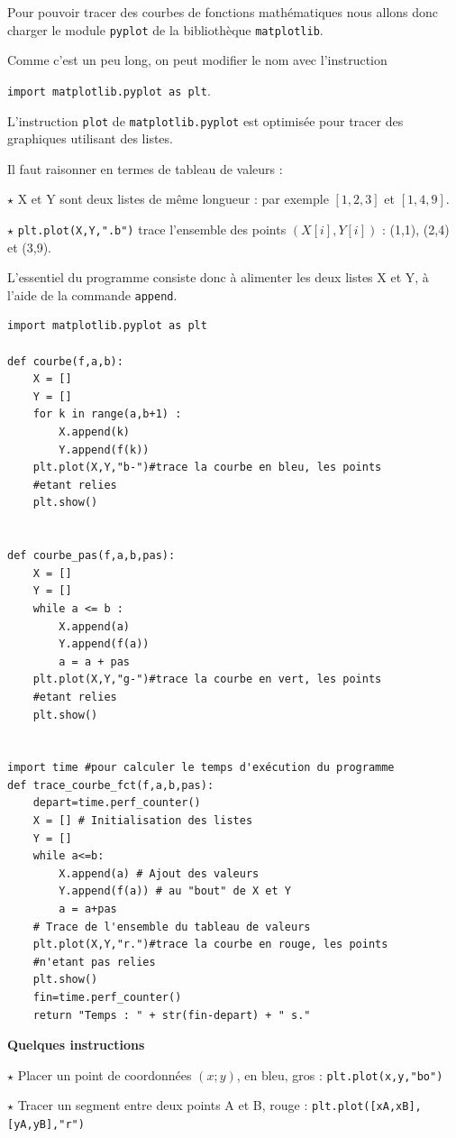 Pour pouvoir tracer des courbes de fonctions mathématiques nous allons donc charger le module \verb!pyplot! de la bibliothèque \verb!matplotlib!.

Comme c'est un peu long, on peut modifier le nom avec l'instruction 

\verb!import matplotlib.pyplot as plt!.


L'instruction \verb!plot! de \verb!matplotlib.pyplot! est optimisée pour tracer des graphiques utilisant des listes. 

Il faut raisonner en termes de \og tableau de valeurs \fg{} :

$\star$ X et Y sont deux listes de même longueur : par exemple $[1,2,3]$ et $[1,4,9]$.

$\star$ \verb!plt.plot(X,Y,".b")! trace l'ensemble des points $(X[i] ,Y[i])$ : (1,1), (2,4) et (3,9).

L'essentiel du programme consiste donc à alimenter les deux listes X et Y, à l'aide de la commande \verb!append!.

\begin{lstlisting}
import matplotlib.pyplot as plt

def courbe(f,a,b):
    X = []
    Y = []
    for k in range(a,b+1) :
        X.append(k)
        Y.append(f(k))
    plt.plot(X,Y,"b-")#trace la courbe en bleu, les points 
    #etant relies
    plt.show()


def courbe_pas(f,a,b,pas):
    X = []
    Y = []
    while a <= b :
        X.append(a)
        Y.append(f(a))
        a = a + pas
    plt.plot(X,Y,"g-")#trace la courbe en vert, les points 
    #etant relies
    plt.show()


import time #pour calculer le temps d'exécution du programme
def trace_courbe_fct(f,a,b,pas):
    depart=time.perf_counter()
    X = [] # Initialisation des listes
    Y = []
    while a<=b:
        X.append(a) # Ajout des valeurs
        Y.append(f(a)) # au "bout" de X et Y
        a = a+pas
    # Trace de l'ensemble du tableau de valeurs
    plt.plot(X,Y,"r.")#trace la courbe en rouge, les points 
    #n'etant pas relies
    plt.show()
    fin=time.perf_counter()
    return "Temps : " + str(fin-depart) + " s."
\end{lstlisting}

\textbf{\large Quelques instructions}

$\star$ Placer un point de coordonnées $(x; y)$, en bleu, gros :
\verb!plt.plot(x,y,"bo")!

$\star$ Tracer un segment entre deux points A et B, rouge :
\verb!plt.plot([xA,xB],[yA,yB],"r")!

